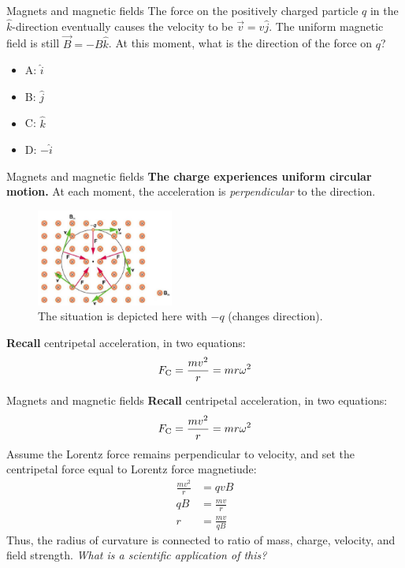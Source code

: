 \documentclass{beamer}
\begin{document}
\begin{frame}{Magnets and magnetic fields}
The force on the positively charged particle $q$ in the $\hat{k}$-direction eventually causes the velocity to be $\vec{v} = v\hat{j}$.  The uniform magnetic field is still $\vec{B} = -B\hat{k}$.  At this moment, what is the direction of the force on $q$?
\begin{itemize}
\item A: $\hat{i}$
\item B: $\hat{j}$
\item C: $\hat{k}$
\item D: $-\hat{i}$
\end{itemize}
\end{frame}

\begin{frame}{Magnets and magnetic fields}
\small
\textbf{\alert{The charge experiences uniform circular motion.}} At each moment, the acceleration is \textit{perpendicular} to the direction.
\begin{figure}
\centering
\includegraphics[width=0.4\textwidth]{figures/qmcircle.png}
\caption{\label{fig:qm} The situation is depicted here with $-q$ (changes direction).}
\end{figure}
\textbf{Recall} centripetal acceleration, in two equations:
\begin{equation}
F_{\rm C} = \frac{m v^2}{r} = m r \omega^2
\end{equation}
\end{frame}

\begin{frame}{Magnets and magnetic fields}
\small
\textbf{Recall} centripetal acceleration, in two equations:
\begin{equation}
F_{\rm C} = \frac{m v^2}{r} = m r \omega^2
\end{equation}
Assume the Lorentz force remains perpendicular to velocity, and set the centripetal force equal to Lorentz force magnetiude:
\begin{align}
\frac{mv^2}{r} &= qv B \\
qB &= \frac{mv}{r} \\
r &= \frac{mv}{qB}
\end{align}
Thus, the radius of curvature is connected to ratio of mass, charge, velocity, and field strength.  \textit{What is a scientific application of this?}
\end{frame}
\end{document}
